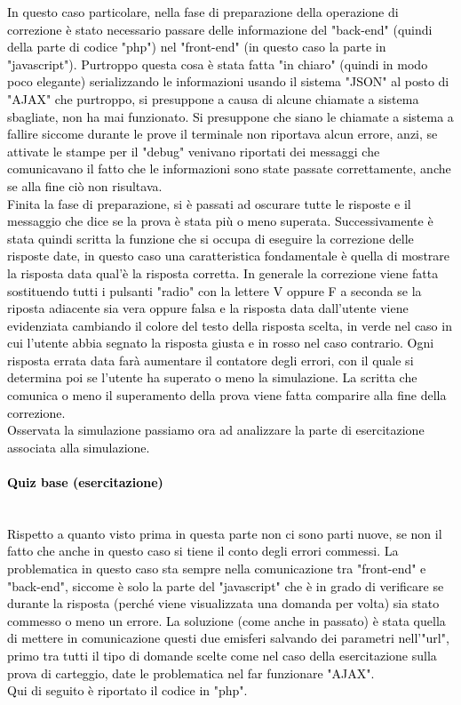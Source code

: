 \textcolor{black}{In questo caso particolare, nella fase di preparazione della operazione di correzione è stato necessario passare delle informazione del "back-end" (quindi della parte di codice "php") nel "front-end" (in questo caso la parte in "javascript"). Purtroppo questa cosa è stata fatta "in chiaro" (quindi in modo poco elegante) serializzando le informazioni usando il sistema "JSON" al posto di "AJAX" che purtroppo, si presuppone a causa di alcune chiamate a sistema sbagliate, non ha mai funzionato. Si presuppone che siano le chiamate a sistema a fallire siccome durante le prove il terminale non riportava alcun errore, anzi, se attivate le stampe per il "debug" venivano riportati dei messaggi che comunicavano il fatto che le informazioni sono state passate correttamente, anche se alla fine ciò non risultava.\\
Finita la fase di preparazione, si è passati ad oscurare tutte le risposte e il messaggio che dice se la prova è stata più o meno superata. Successivamente è stata quindi scritta la funzione che si occupa di eseguire la correzione delle risposte date, in questo caso una caratteristica fondamentale è quella di mostrare la risposta data qual'è la risposta corretta. In generale la correzione viene fatta sostituendo tutti i pulsanti "radio" con la lettere V oppure F a seconda se la riposta adiacente sia vera oppure falsa e la risposta data dall'utente viene evidenziata cambiando il colore del testo della risposta scelta, in verde nel caso in cui l'utente abbia segnato la risposta giusta e in rosso nel caso contrario. Ogni risposta errata data farà aumentare il contatore degli errori, con il quale si determina poi se l'utente ha superato o meno la simulazione. La scritta che comunica o meno il superamento della prova viene fatta comparire alla fine della correzione.}\\

\textcolor{black}{Osservata la simulazione passiamo ora ad analizzare la parte di esercitazione associata alla simulazione.}\\

\paragraph{\textcolor{black}{Quiz base (esercitazione)}}\leavevmode\\
\textcolor{black}{Rispetto a quanto visto prima in questa parte non ci sono parti nuove, se non il fatto che anche in questo caso si tiene il conto degli errori commessi. La problematica in questo caso sta sempre nella comunicazione tra "front-end" e "back-end", siccome è solo la parte del "javascript" che è in grado di verificare se durante la risposta (perché viene visualizzata una domanda per volta) sia stato commesso o meno un errore. La soluzione (come anche in passato) è stata quella di mettere in comunicazione questi due emisferi salvando dei parametri nell'"url", primo tra tutti il tipo di domande scelte come nel caso della esercitazione sulla prova di carteggio, date le problematica nel far funzionare "AJAX".\\
Qui di seguito è riportato il codice in "php".}\\

